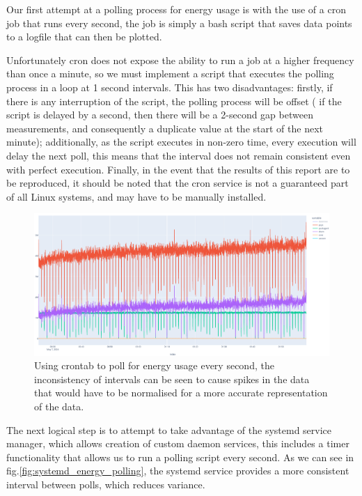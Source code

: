 Our first attempt at a polling process for energy usage is with the use of a cron job that runs every second, the job
is simply a bash script that saves data points to a logfile that can then be plotted.

Unfortunately cron does not expose the ability to run a job at a higher frequency than once a minute, so we must
implement a script that executes the polling process in a loop at 1 second intervals.
This has two disadvantages: firstly, if there is any interruption of the script, the polling process will be offset (
if the script is delayed by a second, then there will be a 2-second gap between measurements, and consequently a
duplicate value at the start of the next minute); additionally, as the script executes in non-zero time, every execution
will delay the next poll, this means that the interval does not remain consistent even with perfect execution.
Finally, in the event that the results of this report are to be reproduced, it should be noted that the cron service is
not a guaranteed part of all Linux systems, and may have to be manually installed.

\begin{figure}[H]
    \centering
    \includegraphics[width=15cm]{figures/introduction/crontab_energy_polling}
    \caption{Using crontab to poll for energy usage every second, the inconsistency of intervals can be seen to cause
    spikes in the data that would have to be normalised for a more accurate representation of the data.}
    \label{fig:crontab_energy_polling}
\end{figure}

The next logical step is to attempt to take advantage of the systemd service manager, which allows creation of custom
daemon services, this includes a timer functionality that allows us to run a polling script every second.
As we can see in fig.\ref{fig:systemd_energy_polling}, the systemd service provides a more consistent interval between
polls, which reduces variance.

